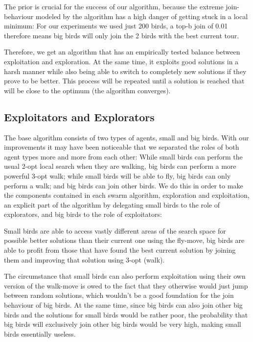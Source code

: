 The prior is crucial for the success of our algorithm, because the extreme join-behaviour modeled by the algorithm has a high danger of getting stuck in a local minimum: For our experiments we used just 200 birds, a top-b join of 0.01 therefore means big birds will only join the 2 birds with the best current tour.

Therefore, we get an algorithm that has an empirically tested balance between exploitation and exploration. At the same time, it exploits good solutions in a harsh manner while also being able to switch to completely new solutions if they prove to be better.
This process will be repeated until a solution is reached that will be close to the optimum (the algorithm converges).

\subsection{Exploitators and Explorators}
The base algorithm consists of two types of agents, small and big birds. With our improvements it may have been noticeable that we separated the roles of both agent types more and more from each other: While small birds can perform the usual 2-opt local search when they are walking, big birds can perform a more powerful 3-opt walk; while small birds will be able to fly, big birds can only perform a walk; and big birds can join other birds.
We do this in order to make the components contained in each swarm algorithm, exploration and exploitation, an explicit part of the algorithm by delegating small birds to the role of explorators, and big birds to the role of exploitators:

Small birds are able to access vastly different areas of the search space for possible better solutions than their current one using the fly-move, big birds are able to profit from those that have found the best current solution by joining them and improving that solution using 3-opt (walk).


The circumstance that small birds can also perform exploitation using their own version of the walk-move is owed to the fact that they otherwise would just jump between random solutions, which wouldn’t be a good foundation for the join behaviour of big birds. At the same time, since big birds can also join other big birds and the solutions for small birds would be rather poor, the probability that big birds will exclusively join other big birds would be very high, making small birds essentially useless.

